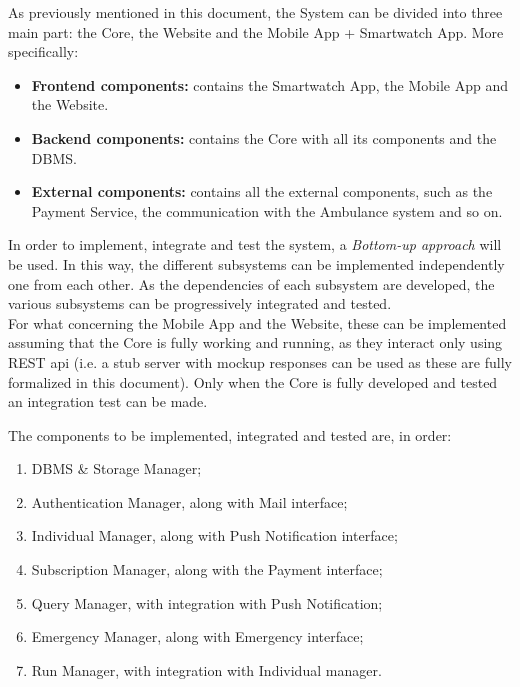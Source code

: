 As previously mentioned in this document, the System can be divided into three main part: the Core, the Website and the Mobile App + Smartwatch App. More specifically:
\begin{itemize}
    \item \textbf{Frontend components:} contains the Smartwatch App, the Mobile App and the Website.
    \item \textbf{Backend components:} contains the Core with all its components and the DBMS.
    \item \textbf{External components:} contains all the external components, such as the Payment Service, the communication with the Ambulance system and so on.
\end{itemize}

\noindent In order to implement, integrate and test the system, a \textit{Bottom-up approach} will be used. In this way, the different subsystems can be implemented independently one from each other. As the dependencies of each subsystem are developed, the various subsystems can be progressively integrated and tested.\\
For what concerning the Mobile App and the Website, these can be implemented assuming that the Core is fully working and running, as they interact only using REST api (i.e. a stub server with mockup responses can be used as these are fully formalized in this document). Only when the Core is fully developed and tested an integration test can be made.

The components to be implemented, integrated and tested are, in order:
\begin{enumerate}
    \item DBMS \& Storage Manager;
    \item Authentication Manager, along with Mail interface;
    \item Individual Manager, along with Push Notification interface;
    \item Subscription Manager, along with the Payment interface;
    \item Query Manager, with integration with Push Notification;
    \item Emergency Manager, along with Emergency interface;
    \item Run Manager, with integration with Individual manager.
\end{enumerate}

\label{CD}

